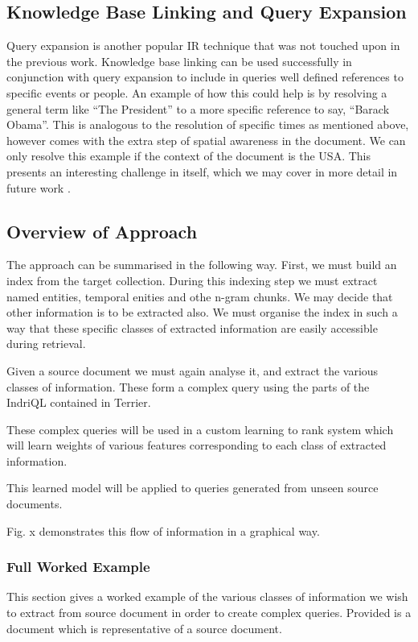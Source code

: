 \documentclass{mprop}
\begin{document}
\subsection{Knowledge Base Linking and Query Expansion}
Query expansion is another popular IR technique that was not touched upon in the previous work. 
Knowledge base linking can be used successfully in conjunction with query expansion to include in queries well defined references to specific events or people. 
An example of how this could help is by resolving a general term like ``The President'' to a more specific reference to say, ``Barack Obama''. 
This is analogous to the resolution of specific times as mentioned above, however comes with the extra step of spatial awareness in the document. We can only resolve this example if the context of the document is the USA. 
This presents an interesting challenge in itself, which we may cover in more detail in future work .

\subsection{Overview of Approach}
The approach can be summarised in the following way.
First, we must build an index from the target collection. During this indexing step we must extract named entities, temporal enities and othe n-gram chunks. 
We may decide that other information is to be extracted also.
We must organise the index in such a way that these specific classes of extracted information are easily accessible during retrieval.

Given a source document we must again analyse it, and extract the various classes of information.
These form a complex query using the parts of the IndriQL contained in Terrier.

These complex queries will be used in a custom learning to rank system which will learn weights of various features corresponding to each class of extracted information.

This learned model will be applied to queries generated from unseen source documents.

Fig. x demonstrates this flow of information in a graphical way.


\subsubsection{Full Worked Example}
This section gives a worked example of the various classes of information we wish to extract from source document in order to create complex queries.
Provided is a document which is representative of a source document.
\end{document}
